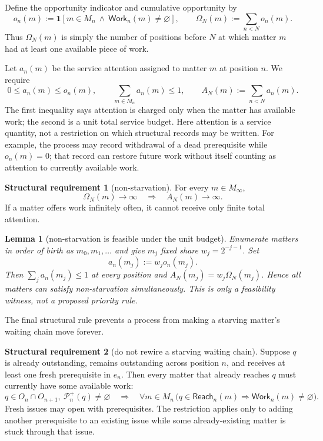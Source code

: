 \documentclass[11pt]{article}
\newtheorem{lemma}{Lemma}
\theoremstyle{definition}
\newtheorem{requirement}{Structural requirement}
\theoremstyle{remark}
\newcommand{\Pre}{\mathcal P}
\newcommand{\Reach}{\mathsf{Reach}}
\newcommand{\Work}{\mathsf{Work}}
\newcommand{\ind}[1]{\mathbf 1[#1]}
\begin{document}
Define the opportunity indicator and cumulative opportunity by
\[
 o_n(m):=\ind{m\in M_n\ \wedge\ \Work_n(m)\neq\varnothing},
 \qquad
 \Omega_N(m):=\sum_{n<N}o_n(m).
\]
Thus $\Omega_N(m)$ is simply the number of positions before $N$ at which
matter $m$ had at least one available piece of work.

Let $a_n(m)$ be the service attention assigned to matter $m$ at position $n$.
We require
\[
 0\le a_n(m)\le o_n(m),
 \qquad
 \sum_{m\in M_n}a_n(m)\le 1,
 \qquad
 A_N(m):=\sum_{n<N}a_n(m).
\]
The first inequality says attention is charged only when the matter has
available work; the second is a unit total service budget. Here attention is a
service quantity, not a restriction on which structural records may be written.
For example, the process may record withdrawal of a dead prerequisite while
$o_n(m)=0$; that record can restore future work without itself counting as
attention to currently available work.

\begin{requirement}[non-starvation]\label{req:nonstarvation}
For every $m\in M_\infty$,
\[
 \Omega_N(m)\to\infty
 \quad\Longrightarrow\quad
 A_N(m)\to\infty.
\]
If a matter offers work infinitely often, it cannot receive only finite total
attention.
\end{requirement}

\begin{lemma}[non-starvation is feasible under the unit budget]\label{lem:nonstarve-feasible}
Enumerate matters in order of birth as $m_0,m_1,\ldots$ and give $m_j$ fixed
share $w_j=2^{-j-1}$. Set
\[
 a_n(m_j):=w_j o_n(m_j).
\]
Then $\sum_j a_n(m_j)\le1$ at every position and
$A_N(m_j)=w_j\Omega_N(m_j)$. Hence all matters can satisfy non-starvation
simultaneously. This is only a feasibility witness, not a proposed priority
rule.
\end{lemma}

The final structural rule prevents a process from making a starving matter's
waiting chain move forever.

\begin{requirement}[do not rewire a starving waiting chain]\label{req:no-rewire}
Suppose $q$ is already outstanding, remains outstanding across position $n$,
and receives at least one fresh prerequisite in $e_n$. Then every matter that
already reaches $q$ must currently have some available work:
\[
 q\in O_n\cap O_{n+1},\ \Pre_n^+(q)\neq\varnothing
 \quad\Longrightarrow\quad
 \forall m\in M_n\,
 \bigl(q\in\Reach_n(m)\Rightarrow\Work_n(m)\neq\varnothing\bigr).
\]
Fresh issues may open with prerequisites. The restriction applies only to
adding another prerequisite to an existing issue while some already-existing
matter is stuck through that issue.
\end{requirement}
\end{document}
